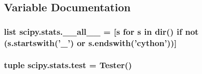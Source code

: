 \subsection{Variable Documentation}
\hypertarget{namespacescipy_1_1stats_aedec9811e2f47e4a4ec3a0f4ca61ad7f}{}
\subsubsection[{\+\_\+\+\_\+all\+\_\+\+\_\+}]{\setlength{\rightskip}{0pt plus 5cm}list scipy.\+stats.\+\_\+\+\_\+all\+\_\+\+\_\+ = \mbox{[}{\bf s} for {\bf s} in dir() {\bf if} not (s.\+startswith('\+\_\+') or s.\+endswith('cython'))\mbox{]}}\label{namespacescipy_1_1stats_aedec9811e2f47e4a4ec3a0f4ca61ad7f}
\hypertarget{namespacescipy_1_1stats_a5d5d5b15ae3ec7287f266c00c86df9b1}{}
\subsubsection[{test}]{\setlength{\rightskip}{0pt plus 5cm}tuple scipy.\+stats.\+test = Tester()}\label{namespacescipy_1_1stats_a5d5d5b15ae3ec7287f266c00c86df9b1}

